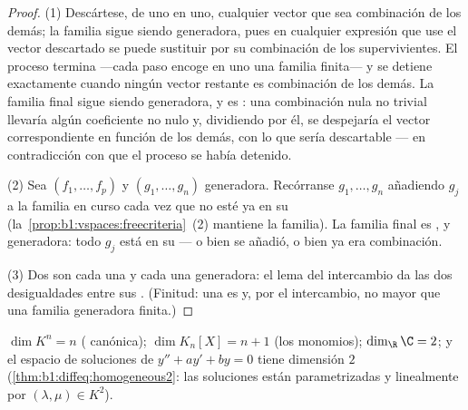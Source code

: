 \begin{proof}
(1) Descártese, de uno en uno, cualquier vector que sea combinación
de los demás; la familia sigue siendo generadora, pues en cualquier
expresión que use el vector descartado se puede sustituir por su
combinación de los supervivientes. El proceso termina ---cada paso
encoge en uno una familia finita--- y se detiene exactamente cuando
ningún vector restante es combinación de los demás. La familia final
sigue siendo generadora, y es : una combinación nula no
trivial llevaría algún coeficiente no nulo y, dividiendo por él, se
despejaría el vector correspondiente en función de los demás, con lo
que sería descartable --- en contradicción con que el proceso se
había detenido.

(2) Sea $(f_1, \dots, f_p)$  y $(g_1, \dots, g_n)$ generadora.
Recórranse $g_1, \dots, g_n$ añadiendo $g_j$ a la familia en curso
cada vez que no esté ya en su 
(la~\cref{prop:b1:vspaces:freecriteria}~(2) mantiene  la
familia). La familia final es , y generadora: todo $g_j$ está
en su  --- o bien se añadió, o bien ya era
combinación.

(3) Dos  son cada una  y cada una generadora: el lema del
intercambio da las dos desigualdades entre sus . (Finitud:
una  es  y, por el intercambio, no mayor que una familia
generadora finita.)
\end{proof}

\begin{example}\label{ex:b1:findim:dims}
$\dim K^n = n$ ( canónica); $\dim K_n[X] = n + 1$ (los
monomios); $\dim_\R \C = 2$; y el espacio de soluciones de
$y'' + ay' + by = 0$ tiene dimensión $2$
(\cref{thm:b1:diffeq:homogeneous2}: las soluciones están
parametrizadas  y linealmente por $(\lambda, \mu) \in K^2$).
\end{example}

